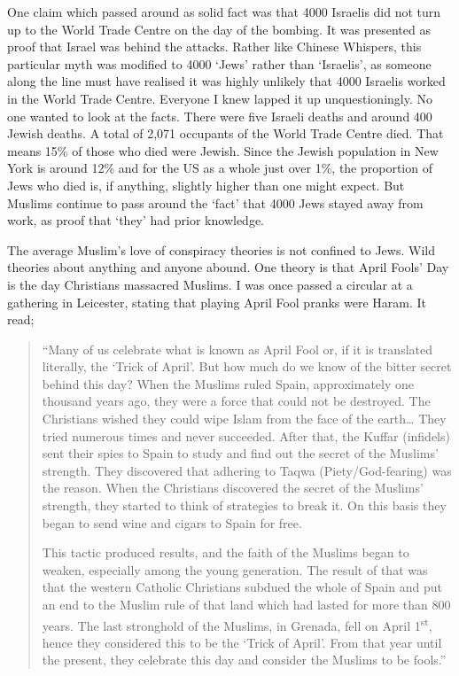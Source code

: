 \documentclass[12pt]{memoir}
\let \Sup=\textsuperscript
\newcommand{\cor}[2]{#2} %
\def\/{\hskip0pt/\hskip0pt}
\begin{document}
One claim which passed around as solid fact was that 4000 Israelis
did not turn up to the World Trade Centre on the day of the bombing.
It was presented as proof that Israel was behind the attacks.
Rather like Chinese Whispers, this particular myth was modified
to 4000 ‘Jews’ rather than ‘Israelis’,
as someone along the line must have realised
it was highly unlikely that 4000 Israelis worked in the World Trade Centre.
Everyone I knew lapped it up unquestioningly.
No one wanted to look at the facts.
There were five Israeli deaths and around 400 Jewish deaths.
A total of 2,071 occupants of the World Trade Centre died.
That means 15\% of those who died were Jewish.
Since the Jewish population in New York is around 12\%
and for the US as a whole just over 1\%,
the proportion of Jews who died is, if anything,
slightly higher than one might expect.
But Muslims continue to pass around the ‘fact’
that 4000 Jews stayed away from work,
as proof that ‘they’ had prior knowledge.

The average Muslim’s love of conspiracy theories is not confined to Jews.
Wild theories about anything and anyone abound.
One theory is that April \cor{Fool’s}{Fools’} Day
is the day Christians massacred Muslims.
I was once passed a circular at a gathering in Leicester,
stating that playing April Fool pranks were Haram.
It read;

\begin{quote}
“Many of us celebrate what is known as April Fool or,
if it is translated literally, the ‘Trick of April’.
But how much do we know of the bitter secret behind this day?
When the Muslims ruled Spain, approximately one thousand years ago,
they were a force that could not be destroyed.
The Christians wished they could wipe Islam from the face of the earth…
They tried numerous times and never succeeded.
After that, the Kuffar (infidels) sent their spies to Spain
to study and find out the secret of the Muslims’ strength.
They discovered that adhering to Taqwa (Piety\/God-fearing) was the reason.
When the Christians discovered the secret of the Muslims’ strength,
they started to think of strategies to break it.
On this basis they began to send wine and cigars to Spain for free.

This tactic produced results, and the faith of the Muslims began to weaken,
especially among the young generation.
The result of that was that the western Catholic Christians subdued
the whole of Spain and put an end to the Muslim rule of that land
which had lasted for more than 800 years.
The last stronghold of the Muslims, in Grenada, fell on April 1\Sup{st},
hence they considered this to be the ‘Trick of April’.
From that year until the present,
they celebrate this day and consider the Muslims to be fools.”
\end{quote}
\end{document}
